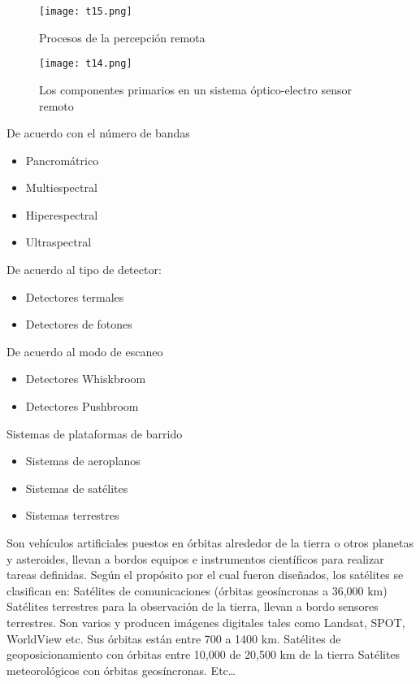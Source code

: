 \begin{figure}[h!]
  \centering
  \texttt{[image: t15.png]}
  \caption{Procesos de la percepción remota}
  \label{t15}
\end{figure}

\begin{figure}[h!]
  \centerline{\texttt{[image: t14.png]}}
  \caption{Los componentes primarios en un sistema óptico-electro sensor remoto}
  \label{t14}
\end{figure}
De acuerdo con el número de bandas
\begin{itemize}
  \item Pancromátrico
  \item Multiespectral
  \item Hiperespectral
  \item Ultraspectral
\end{itemize}

De acuerdo al tipo de detector:
\begin{itemize}
  \item Detectores termales
  \item Detectores de fotones
\end{itemize}

De acuerdo al modo de escaneo
\begin{itemize}
  \item Detectores Whiskbroom
  \item Detectores Pushbroom
\end{itemize}

Sistemas de plataformas de barrido

\begin{itemize}
  \item Sistemas de aeroplanos
  \item Sistemas de satélites
  \item Sistemas terrestres
\end{itemize}

\begin{definition}[Satélites]
  Son vehículos artificiales puestos en órbitas alrededor de la tierra o otros planetas y asteroides, llevan a bordos equipos e instrumentos científicos para realizar tareas definidas. Según el propósito por el cual fueron diseñados, los satélites se clasifican en:
Satélites de comunicaciones (órbitas geosíncronas a 36,000 km)
Satélites terrestres para la observación de la tierra, llevan a bordo sensores terrestres. Son varios y  producen imágenes digitales tales como Landsat, SPOT, WorldView etc. Sus órbitas están entre 700 a 1400 km.
Satélites de geoposicionamiento con órbitas entre 10,000 de 20,500 km de la tierra
Satélites meteorológicos con órbitas geosíncronas.
Etc…
\end{definition}

